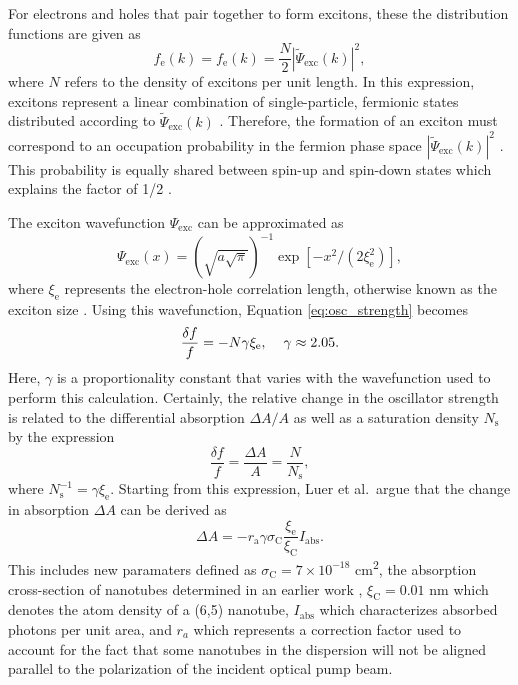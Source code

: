 For electrons and holes that pair together to form excitons, these the distribution functions are given as
%
\begin{equation}
	f_\text{e}(k) = f_\text{e}(k) = \frac{N}{2} | \tilde{\Psi}_\text{exc}(k)|^2,
\end{equation}
%
where $N$ refers to the density of excitons per unit length. In this expression, excitons represent a linear combination of single-particle, fermionic states distributed according to $\tilde{\Psi}_\text{exc}(k)$ \cite{schmitt1985theory}. Therefore, the formation of an exciton must correspond to an occupation probability in the fermion phase space $|\tilde{\Psi}_\text{exc}(k)|^2$ \cite{schmitt1985theory}. This probability is equally shared between spin-up and spin-down states which explains the factor of 1/2 \cite{schmitt1985theory}.

The exciton wavefunction $\Psi_\text{exc}$ can be approximated as
\begin{equation}
	\Psi_\text{exc}(x) = \left( \sqrt{a \sqrt{\pi}} \right)^{-1} \exp[-x^2 / (2 \xi^2_\text{e})],
\end{equation}
where $\xi_\text{e}$ represents the electron-hole correlation length, otherwise known as the exciton size \cite{capaz2006diameter}. Using this wavefunction, Equation \eqref{eq:osc_strength} becomes
%
\begin{equation}
	\frac{\delta f}{f} = - N \gamma \xi_\text{e}, \hspace{4mm} \gamma \approx 2.05.
\end{equation}
%
Here, $\gamma$ is a proportionality constant that varies with the wavefunction used to perform this calculation. Certainly, the relative change in the oscillator strength is related to the differential absorption $\Delta A / A$ as well as a saturation density $N_\text{s}$ by the expression
\begin{equation}
	\frac{\delta f}{f} = \frac{\Delta A}{A} = \frac{N}{N_\text{s}},
\end{equation}
where $N_\text{s}^{-1} = \gamma \xi_\text{e}$. Starting from this expression, Luer et al.\ argue that the change in absorption $\Delta A$ can be derived as
\begin{equation}
	\Delta A = -r_\text{a} \gamma \sigma_\text{C} \frac{\xi_\text{e}}{\xi_\text{C}} I_\text{abs}.
	\label{eq:abs_exc_len}
\end{equation}
This includes new paramaters defined as $\sigma_\text{C} = 7 \times 10^{-18}$ \si{\cm\squared}, the absorption cross-section of nanotubes determined in an earlier work \cite{zheng2004solution}, $\xi_\text{C} = 0.01$ nm which denotes the atom density of a (6,5) nanotube, $I_\text{abs}$ which characterizes absorbed photons per unit area, and $r_{a}$ which represents a correction factor used to account for the fact that some nanotubes in the dispersion will not be aligned parallel to the polarization of the incident optical pump beam.

